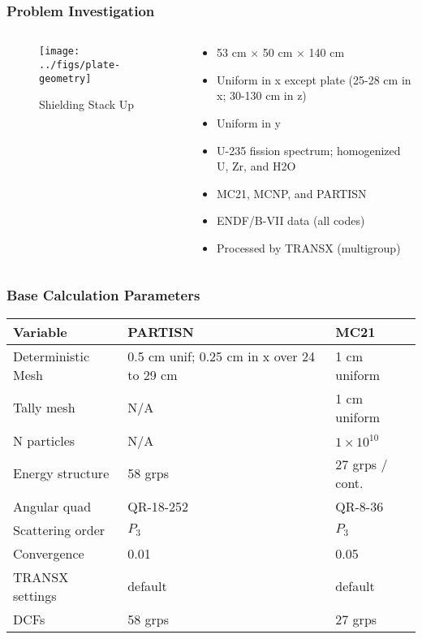 \documentclass[xcolor=x11names,compress]{beamer}
\renewcommand{\(}{\begin{columns}}
\renewcommand{\)}{\end{columns}}
\newcommand{\<}[1]{\begin{column}{#1}}
\renewcommand{\>}{\end{column}}
\begin{document}
\begin{frame}[fragile]
  \frametitle{Problem Investigation}
  	\begin{columns}
  	\begin{column}{0.45\textwidth}
  	\begin{figure}
  		\texttt{[image: ../figs/plate-geometry]}
  		\caption{Shielding Stack Up}
  	\end{figure}
  	\end{column}
 	\begin{column}{0.6\textwidth}
	\begin{itemize}
	\item 53 cm $\times$ 50 cm $\times$ 140 cm 
	\item Uniform in x except plate (25-28 cm in x; 30-130 cm in z)
	\item Uniform in y
	\item U-235 fission spectrum; homogenized U, Zr, and H2O
	\vspace*{1 em}
	\item MC21, MCNP, and PARTISN
	\item ENDF/B-VII data (all codes)
	\item Processed by TRANSX (multigroup)
	\end{itemize}
  	\end{column}
	\end{columns}
  
\end{frame}


\begin{frame}[fragile]
  \frametitle{Base Calculation Parameters}
  \begin{table}[p]
  \label{tab:calcParams}
  \begin{center}
    \begin{tabu}{| X | X | X |}\hline
      Variable & PARTISN & MC21\\\hline\hline
	Deterministic Mesh & 0.5 cm unif; 0.25 cm in x over 24 to 29 cm & 1 cm uniform \\\hline
	Tally mesh & N/A & 1 cm uniform \\\hline
	N particles & N/A & $1 \times 10^{10}$\\\hline
	Energy structure & 58 grps & 27 grps / cont.\\\hline
	Angular quad & QR-18-252 & QR-8-36\\\hline
	Scattering order & $P_3$ & $P_3$\\\hline
	Convergence & 0.01 & 0.05\\\hline
	TRANSX settings & default & default\\\hline
	DCFs & 58 grps & 27 grps \\\hline
    \end{tabu}
  \end{center}
\end{table}
  
\end{frame}
\end{document}
